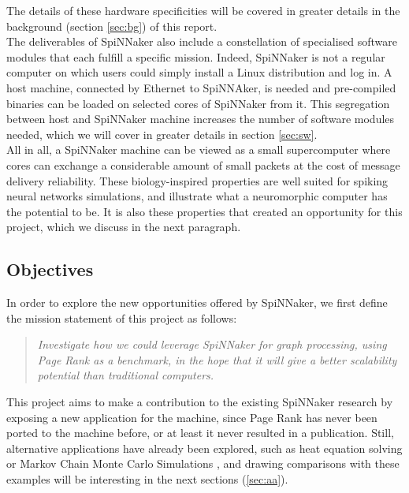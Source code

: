 The details of these hardware specificities will be covered in greater details in the background (section \ref{sec:bg}) of this report. \\

The deliverables of SpiNNaker also include a constellation of specialised software modules that each fulfill a specific mission. Indeed, SpiNNaker is not a regular computer on which users could simply install a Linux distribution and log in. A host machine, connected by Ethernet to SpiNNAker, is needed and pre-compiled binaries can be loaded on selected cores of SpiNNaker from it. This segregation between host and SpiNNaker machine increases the number of software modules needed, which we will cover in greater details in section \ref{sec:sw}. \\

All in all, a SpiNNaker machine can be viewed as a small supercomputer where cores can exchange a considerable amount of small packets at the cost of message delivery reliability. These biology-inspired properties are well suited for spiking neural networks simulations, and illustrate what a neuromorphic computer has the potential to be. It is also these properties that created an opportunity for this project, which we discuss in the next paragraph. \\


\subsection{Objectives}


In order to explore the new opportunities offered by SpiNNaker, we first define the mission statement of this project as follows:


\begin{quote}
\textit{Investigate how we could leverage SpiNNaker for graph processing, using Page Rank as a benchmark, in the hope that it will give a better scalability potential than traditional computers.
}\end{quote}

This project aims to make a contribution to the existing SpiNNaker research by exposing a new application for the machine, since Page Rank has never been ported to the machine before, or at least it never resulted in a publication. Still, alternative applications have already been explored, such as heat equation solving \cite{heat} or Markov Chain Monte Carlo Simulations \cite{markov-on-spinn}, and drawing comparisons with these examples will be interesting in the next sections (\ref{sec:aa}). \\

